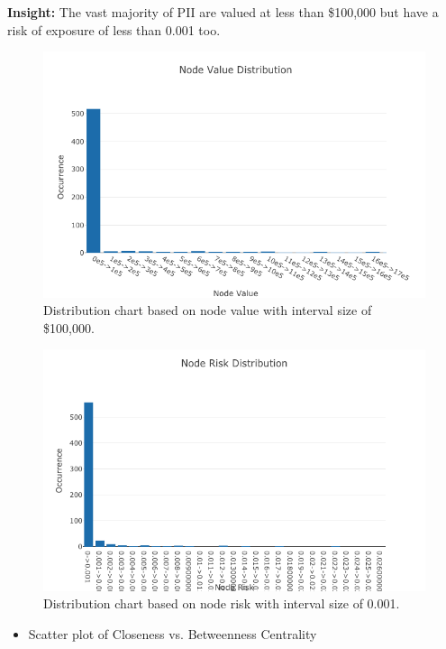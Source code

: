 \documentclass[conference]{IEEEtran}
\begin{document}
{\bf Insight:} The vast majority of PII are valued at less than \$100,000 but have a risk of exposure of less than 0.001 too.

\begin{figure}[ht!]
  \includegraphics[width=\linewidth]{node_value_distribution.png}
  \caption{Distribution chart based on node value with interval size of \$100,000.}
  \label{fig:node_value_distribution}
\end{figure}

\begin{figure}[ht!]
  \includegraphics[width=\linewidth]{node_risk_distribution.png}
  \caption{Distribution chart based on node risk with interval size of 0.001.}
  \label{fig:node_risk_distribution}
\end{figure}

\begin{itemize}
\item Scatter plot of Closeness vs. Betweenness Centrality
\end{itemize}
\end{document}
